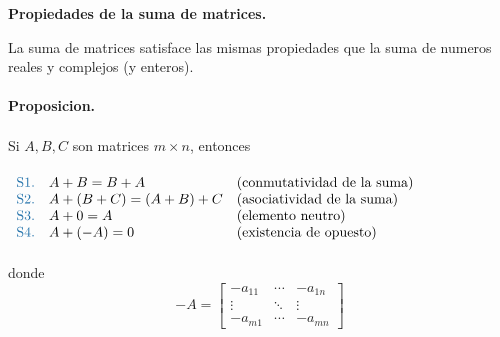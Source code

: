\documentclass{article}
\theoremstyle{definition}
\theoremstyle{definition}
\theoremstyle{remark}
\begin{document}
\begin{center}
\textbf{Propiedades de la suma de matrices.}
\end{center}
La suma de matrices satisface las mismas propiedades que la suma de numeros reales y complejos (y enteros).\\\\
\textbf{Proposicion.} \\\\
Si $A,B,C$ son matrices $m \times n$, entonces \\\\ $\begin{array}{llll} \textcolor{azulp2}{\text{S1.}} & A+B=B+A & \text{(conmutatividad de la suma)} \\ 
  \textcolor{azulp2}{\text{S2.}} & A+(B+C)=(A+B)+C & \text{(asociatividad de la suma)} \\ 
  \textcolor{azulp2}{\text{S3.}} &A+0=A & \text{(elemento neutro)} \\ 
 \textcolor{azulp2}{\text{S4.}} & A+(-A)=0 & \text{(existencia de opuesto)} \\ 
\end{array}$ \\\\
donde \[
-A=\begin{bmatrix} -a_{11} & \cdots & -a_{1n} \\
      \vdots & \ddots  & \vdots \\
      -a_{m1} & \cdots & -a_{mn}
\end{bmatrix}
\]
\pagebreak
\end{document}
